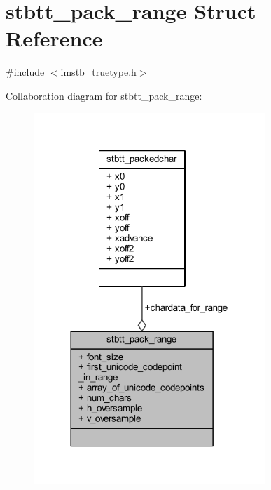 \hypertarget{structstbtt__pack__range}{}\section{stbtt\+\_\+pack\+\_\+range Struct Reference}
\label{structstbtt__pack__range}


{\ttfamily \#include $<$imstb\+\_\+truetype.\+h$>$}



Collaboration diagram for stbtt\+\_\+pack\+\_\+range\+:
\nopagebreak
\begin{figure}[H]
\begin{center}
\leavevmode
\includegraphics[width=248pt]{structstbtt__pack__range__coll__graph}
\end{center}
\end{figure}
